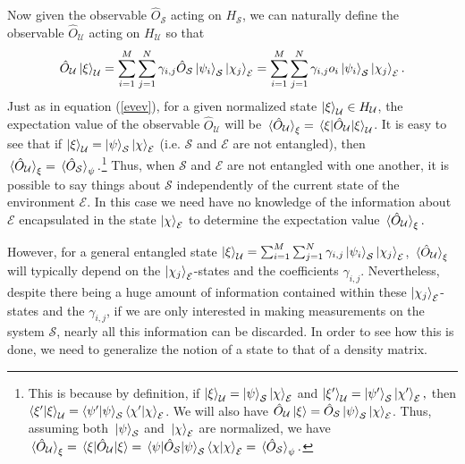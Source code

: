      Now given the observable $\hat{O}_{\mathcal{S}}$ acting on $H_\mathcal{S}$, we can  naturally define the observable $\hat{O}_\mathcal{U}$ acting on $H_\mathcal{U}$ so that 
    \begin{equation}\label{extension}\hat{O}_\mathcal{U}\ket{\xi}_\mathcal{U}=\sum_{i=1}^M\sum_{j=1}^N\gamma_{i,j}\hat{O}_\mathcal{S}\ket{\psi_i}_\mathcal{S}\ket{\chi_j}_\mathcal{E}=\sum_{i=1}^M\sum_{j=1}^N\gamma_{i,j}o_i\ket{\psi_i}_\mathcal{S}\ket{\chi_j}_\mathcal{E}.
    \end{equation}Just   %
%
    as in equation (\ref{evev}), for a given normalized state $\ket{\xi}_\mathcal{U}\in H_\mathcal{U}$, the expectation value of the observable $\hat{O}_\mathcal{U}$ will be $\ev*{\hat{O}_\mathcal{U}}_\xi=\ev*{\hat{O}_\mathcal{U}}{\xi}_\mathcal{U}$. It is easy to see that if $\ket{\xi}_\mathcal{U}=\ket{\psi}_\mathcal{S}\ket{\chi}_\mathcal{E}$ (i.e. $\mathcal{S}$ and $\mathcal{E}$ are not entangled), then $\ev*{\hat{O}_\mathcal{U}}_\xi=\ev*{\hat{O}_\mathcal{S}}_\psi.$\footnote{\label{untangledobservable}This is because by definition, if $\ket{\xi}_\mathcal{U}=\ket{\psi}_\mathcal{S}\ket{\chi}_\mathcal{E}$ and $\ket{\xi'}_\mathcal{U}=\ket{\psi'}_\mathcal{S}\ket{\chi'}_\mathcal{E},$ then $\ip{\xi'}{\xi}_\mathcal{U}=\ip{\psi'}{\psi}_\mathcal{S}\ip{\chi'}{\chi}_\mathcal{E}$. We will also have $\hat{O}_\mathcal{U}\ket{\xi}=\hat{O}_\mathcal{S}\ket{\psi}_\mathcal{S}\ket{\chi}_\mathcal{E}$. Thus, assuming both $\ket*{\psi}_\mathcal{S}$ and $\ket*{\chi}_\mathcal{E}$ are normalized, we have $\ev*{\hat{O}_\mathcal{U}}_\xi=\ev*{\hat{O}_\mathcal{U}}{\xi}=\ev*{\hat{O}_\mathcal{S}}{\psi}_\mathcal{S}\ip{\chi}{\chi}_\mathcal{E}=\ev*{\hat{O}_\mathcal{S}}_\psi.$} Thus, when $\mathcal{S}$ and $\mathcal{E}$ are not entangled with one another, it is possible to say things about $\mathcal{S}$ independently of the current state of the environment  $\mathcal{E}$. In this case we need have no knowledge of the information about $\mathcal{E}$ encapsulated in the state $\ket{\chi}_\mathcal{E}$ to determine the expectation value $\ev*{\hat{O}_\mathcal{U}}_\xi. $
    
    However, for a general entangled state $\ket{\xi}_\mathcal{U}=\sum_{i=1}^M\sum_{j=1}^N\gamma_{i,j}\ket{\psi_i}_\mathcal{S}\ket{\chi_j}_\mathcal{E}$,  $\ev*{\hat{O}_\mathcal{U}}_\xi $ will typically depend on the $\ket{\chi_j}_\mathcal{E}$-states and the coefficients $\gamma_{i,j}$. Nevertheless, despite there being a huge amount of information contained within these $\ket{\chi_j}_\mathcal{E}$-states and the  $\gamma_{i,j}$, if we are only interested in making measurements on the system $\mathcal{S}$, nearly all this information can be discarded. In order to see how this is done, we need to generalize the notion of a state to that of a density matrix. 
